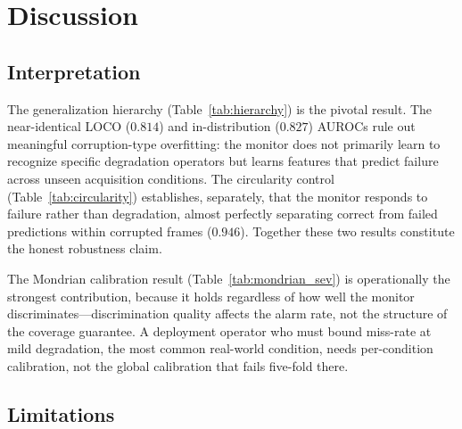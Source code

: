 \documentclass[letterpaper, 10 pt, conference]{ieeeconf}  %
\begin{document}
\section{Discussion}

\subsection{Interpretation}

The generalization hierarchy (Table~\ref{tab:hierarchy}) is the pivotal
result. The near-identical LOCO ($0.814$) and in-distribution ($0.827$)
AUROCs rule out meaningful corruption-type overfitting: the monitor does not
primarily learn to recognize specific degradation operators but learns
features that predict failure across unseen acquisition conditions. The
circularity control (Table~\ref{tab:circularity}) establishes, separately,
that the monitor responds to failure rather than degradation, almost perfectly
separating correct from failed predictions within corrupted frames
($0.946$). Together these two results constitute the honest robustness claim.

The Mondrian calibration result (Table~\ref{tab:mondrian_sev}) is
operationally the strongest contribution, because it holds regardless of how
well the monitor discriminates---discrimination quality affects the alarm
rate, not the structure of the coverage guarantee. A deployment operator who
must bound miss-rate at mild degradation, the most common real-world
condition, needs per-condition calibration, not the global calibration that
fails five-fold there.

\subsection{Limitations}
\end{document}
